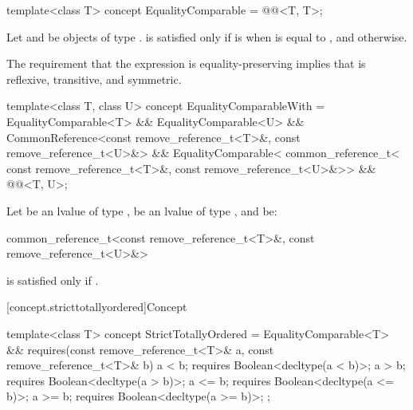 %
\begin{itemdecl}
template<class T>
  concept EqualityComparable = @@<T, T>;
\end{itemdecl}

\begin{itemdescr}
\pnum
Let  and  be objects of type .
 is satisfied only if
 is  when  is equal to
, and  otherwise.

\pnum
\begin{note}
The requirement that the expression  is equality-preserving
implies that \tcode{==} is reflexive, transitive, and symmetric.
\end{note}
\end{itemdescr}

%
\begin{itemdecl}
template<class T, class U>
  concept EqualityComparableWith =
    EqualityComparable<T> && EqualityComparable<U> &&
    CommonReference<const remove_reference_t<T>&, const remove_reference_t<U>&> &&
    EqualityComparable<
      common_reference_t<
        const remove_reference_t<T>&,
        const remove_reference_t<U>&>> &&
    @@<T, U>;
\end{itemdecl}

\begin{itemdescr}
\pnum
Let  be an lvalue of type ,
 be an lvalue of type ,
and  be:
\begin{codeblock}
common_reference_t<const remove_reference_t<T>&, const remove_reference_t<U>&>
\end{codeblock}
 is satisfied only if
.
\end{itemdescr}

[concept.stricttotallyordered]{Concept }

%
\begin{itemdecl}
template<class T>
  concept StrictTotallyOrdered = EqualityComparable<T> &&
    requires(const remove_reference_t<T>& a,
             const remove_reference_t<T>& b) {
      a <  b; requires Boolean<decltype(a <  b)>;
      a >  b; requires Boolean<decltype(a >  b)>;
      a <= b; requires Boolean<decltype(a <= b)>;
      a >= b; requires Boolean<decltype(a >= b)>;
    };
\end{itemdecl}

